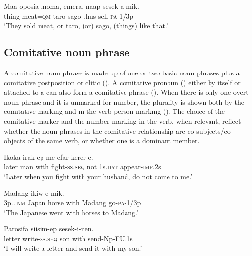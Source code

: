 \ea%
\label{ex:x818}
\gll Maa  oposia  moma,  emera,  naap  sesek-a-mik. \\
  thing  meat=\textsc{qm}  taro  sago  thus  sell-\textsc{pa}-1/3p    \\
\glt`They sold meat, or taro, (or) sago, (things) like that.'
\z





\subsection{Comitative noun phrase}
{}
A comitative noun phrase is made up of one or two basic noun phrases plus a comitative postposition or clitic (). A comitative pronoun () either by itself or attached to a  can also form a comitative phrase (). When there is only one overt noun phrase and it  is unmarked for number, the plurality is shown both by the comitative marking and in the verb person marking (). The choice of the comitative marker and the number marking in the verb, when relevant,  reflect whether the noun phrases in the comitative relationship are co-subjects/co-objects of the same verb, or whether one is a dominant member. 

\ea%
\label{ex:x828}
\gll Ikoka     irak-ep  me  efar  kerer-e. \\
   later  man  with  fight-\textsc{ss}.\textsc{seq}  not  1s.\textsc{dat}  appear-\textsc{imp}.2s   \\
\glt`Later when you fight with your husband, do not come to me.'
\z





\ea%
\label{ex:x829}
\gll {}     Madang  ikiw-e-mik. \\
    3p.\textsc{unm}  Japan  horse  with  Madang  go-\textsc{pa}-1/3p  \\
\glt`The Japanese went with horses to Madang.'
\z





\ea%
\label{ex:x830}
\gll Parosifa  siisim-ep     sesek-i-nen. \\
    letter  write-\textsc{ss}.\textsc{seq}  son  with  send-Np-FU.1s  \\
\glt`I will write a letter and send it with my son.'
\z





